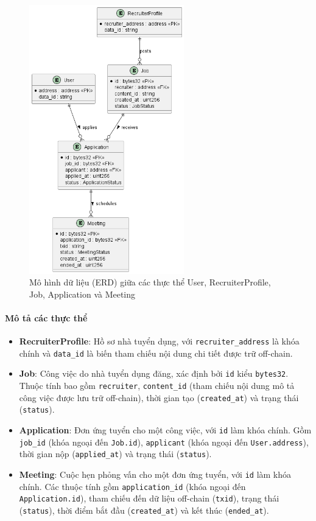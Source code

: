   \begin{figure}[H]
    \centering
    \includegraphics[width=0.6\textwidth]{../images/ERD-sub3.png}
    \caption{Mô hình dữ liệu (ERD) giữa các thực thể User, RecruiterProfile, Job, Application và Meeting}
    \label{fig:erd-sub3}
  \end{figure}

  \paragraph{Mô tả các thực thể}

    \begin{itemize}
      \item \textbf{RecruiterProfile}: Hồ sơ nhà tuyển dụng, với \texttt{recruiter\_address} là khóa chính và \texttt{data\_id} là biến tham chiếu nội dung chi tiết được trữ off-chain.
      \item \textbf{Job}: Công việc do nhà tuyển dụng đăng, xác định bởi \texttt{id} kiểu \texttt{bytes32}. Thuộc tính bao gồm \texttt{recruiter}, \texttt{content\_id} (tham chiếu nội dung mô tả công việc được lưu trữ off-chain), thời gian tạo (\texttt{created\_at}) và trạng thái (\texttt{status}).
      \item \textbf{Application}: Đơn ứng tuyển cho một công việc, với \texttt{id} làm khóa chính. Gồm \texttt{job\_id} (khóa ngoại đến \texttt{Job.id}), \texttt{applicant} (khóa ngoại đến \texttt{User.address}), thời gian nộp (\texttt{applied\_at}) và trạng thái (\texttt{status}).
      \item \textbf{Meeting}: Cuộc hẹn phỏng vấn cho một đơn ứng tuyển, với \texttt{id} làm khóa chính. Các thuộc tính gồm \texttt{application\_id} (khóa ngoại đến \texttt{Application.id}), tham chiếu đến dữ liệu off-chain (\texttt{txid}), trạng thái (\texttt{status}), thời điểm bắt đầu (\texttt{created\_at}) và kết thúc (\texttt{ended\_at}).
    \end{itemize}

